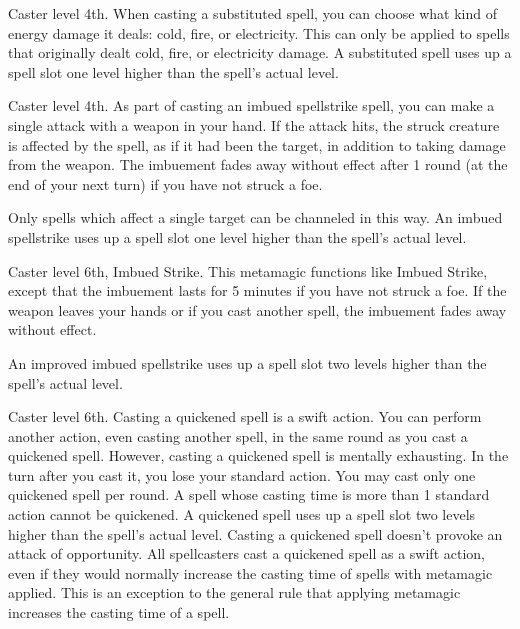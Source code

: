  Caster level 4th.
 When casting a substituted spell, you can choose what kind of energy damage it deals: cold, fire, or electricity. This can only be applied to spells that originally dealt cold, fire, or electricity damage. A substituted spell uses up a spell slot one level higher than the spell's actual level.

 Caster level 4th.
 As part of casting an imbued spellstrike spell, you can make a single attack with a weapon in your hand. If the attack hits, the struck creature is affected by the spell, as if it had been the target, in addition to taking damage from the weapon. The imbuement fades away without effect after 1 round (at the end of your next turn) if you have not struck a foe.

Only spells which affect a single target can be channeled in this way. An imbued spellstrike uses up a spell slot one level higher than the spell's actual level.

 Caster level 6th, Imbued Strike.
 This metamagic functions like Imbued Strike, except that the imbuement lasts for 5 minutes if you have not struck a foe. If the weapon leaves your hands or if you cast another spell, the imbuement fades away without effect.

An improved imbued spellstrike uses up a spell slot two levels higher than the spell's actual level.

 Caster level 6th.
 Casting a quickened spell is a swift action. You can perform another action, even casting another spell, in the same round as you cast a quickened spell. However, casting a quickened spell is mentally exhausting. In the turn after you cast it, you lose your standard action. You may cast only one quickened spell per round. A spell whose casting time is more than 1 standard action cannot be quickened. A quickened spell uses up a spell slot two levels higher than the spell's actual level. Casting a quickened spell doesn't provoke an attack of opportunity.
 All spellcasters cast a quickened spell as a swift action, even if they would normally increase the casting time of spells with metamagic applied. This is an exception to the general rule that applying metamagic increases the casting time of a spell.

